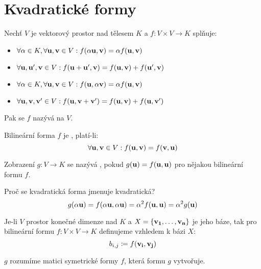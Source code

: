 \section{Kvadratické formy}

\begin{definition}
    Nechť $V$ je vektorový prostor nad tělesem $K$ a $f: V \times V 
    \rightarrow K$ splňuje:
    \begin{itemize}
        \item $\forall \alpha \in K, \forall \mathbf{u}, \mathbf{v} \in V:
            f(\alpha\mathbf{u}, \mathbf{v}) = \alpha f(\mathbf{u}, \mathbf{v})$
        \item $\forall \mathbf{u}, \mathbf{u}', \mathbf{v} \in V: 
            f(\mathbf{u} + \mathbf{u}', \mathbf{v}) = f(\mathbf{u},\mathbf{v}) + f(\mathbf{u}', \mathbf{v})$
        \item $\forall \alpha \in K, \forall \mathbf{u}, \mathbf{v} \in V: 
            f(\mathbf{u}, \alpha\mathbf{v}) = \alpha f(\mathbf{u}, \mathbf{v})$
        \item $\forall \mathbf{u}, \mathbf{v}, \mathbf{v}' \in V: 
            f(\mathbf{u}, \mathbf{v} + \mathbf{v}') = f(\mathbf{u}, \mathbf{v}) + f(\mathbf{u}, \mathbf{v}')$
    \end{itemize}
    Pak se $f$ nazývá  na $V$.
\end{definition}

\begin{definition}
    Bilineární forma $f$ je , platí-li:
    $$\forall \mathbf{u}, \mathbf{v} \in V: f(\mathbf{u}, \mathbf{v}) = f(\mathbf{v}, \mathbf{u})$$
\end{definition}

\begin{definition}
    Zobrazení $g: V \rightarrow K$ se nazývá ,
    pokud $g(\mathbf{u}) = f(\mathbf{u},\mathbf{u})$ pro nějakou bilineární formu $f$.
\end{definition}

\begin{remark}
    Proč se kvadratická forma jmenuje kvadratická?
    $$g(\alpha \mathbf{u}) = f(\alpha \mathbf{u}, \alpha \mathbf{u}) = \alpha^2 f(\mathbf{u},\mathbf{u}) =
    \alpha^2 g(\mathbf{u})$$
\end{remark}

\begin{definition}
    Je-li $V$ prostor konečné dimenze nad $K$ a 
    $X = \{\mathbf{v_1}, \dots, \mathbf{v_n}\}$ je jeho báze, tak pro bilineární formu
    $f: V \times V \rightarrow K$ definujeme 
    vzhledem k bázi $X$:
    $$b_{i,j} \coloneqq f(\mathbf{v_i}, \mathbf{v_j})$$
\end{definition}

\begin{definition}
     $g$ rozumíme matici 
    symetrické formy $f$, která formu $g$ vytvořuje.
\end{definition}


